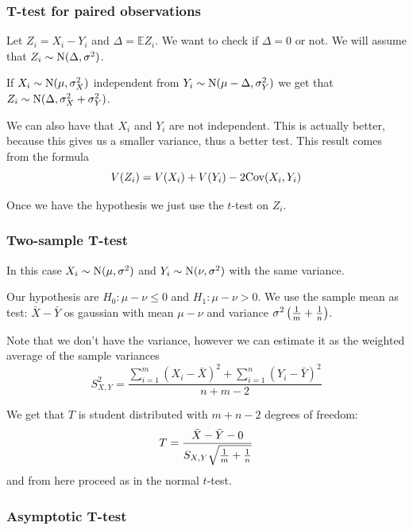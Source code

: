 \documentclass[12pt]{extarticle}
\newcommand{\cov}{{\operatorfont Cov}}
\newcommand{\Normal}{{\operatorfont N}}
\begin{document}
\subsubsection{T-test for paired observations}

Let $Z_i = X_i - Y_i$ and $\Delta = \mathbb E Z_i$.
We want to check if $\Delta = 0$ or not.
We will assume that $Z_i \sim \Normal(\Delta, \sigma^2)$.

If $X_i \sim \Normal(\mu, \sigma_X^2)$ independent from $Y_i \sim \Normal(\mu - \Delta, \sigma_Y^2)$
we get that $Z_i \sim \Normal(\Delta, \sigma_X^2 + \sigma_Y^2)$.

We can also have that $X_i$ and $Y_i$ are not independent.
This is actually better, because this gives us a smaller variance, thus a better test.
This result comes from the formula
\begin{equation}
    V(Z_i) = V(X_i) + V(Y_i) - 2 \cov (X_i, Y_i)
\end{equation}

Once we have the hypothesis we just use the $t$-test on $Z_i$.

\subsubsection{Two-sample T-test}

In this case $X_i \sim \Normal(\mu, \sigma^2)$ and $Y_i \sim \Normal(\nu, \sigma^2)$
with the same variance.

Our hypothesis are $H_0 : \mu - \nu \leq 0$ and $H_1 : \mu - \nu > 0$.
We use the sample mean as test: $\bar X- \bar Y$ os gaussian with mean $\mu - \nu$
and variance $\sigma^2 \left(\frac{1}{m} + \frac{1}{n}\right)$.

Note that we don't have the variance, however we can estimate it as the weighted average of the sample variances
\begin{equation}
    S^2_{X, Y} = \frac{\sum^m_{i = 1} (X_i - \bar X)^2 + \sum^n_{i = 1} (Y_i - \bar Y)^2 }{n + m - 2}
\end{equation}

We get that $T$ is student distributed with $m + n - 2$ degrees of freedom:
\begin{equation}
    T = \frac{\bar X - \bar Y - 0}{S_{X, Y} \sqrt{\frac{1}{m} + \frac{1}{n}}}
\end{equation}
and from here proceed as in the normal $t$-test.

\subsubsection{Asymptotic T-test}
\end{document}
